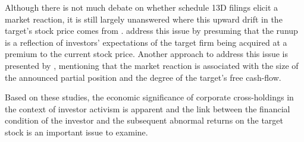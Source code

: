 \documentclass[12pt]{article}
\begin{document}
Although there is not much debate on whether schedule 13D filings elicit a market reaction, it is still largely unanswered where this upward drift in the target's stock price comes from \citep{Greenwood2009}. \citet{Greenwood2009} address this issue by presuming that the runup is a reflection of investors' expectations of the target firm being acquired at a premium to the current stock price. Another approach to address this issue is presented by \citet{Akhigbe2007}, mentioning that the market reaction is associated with the size of the announced partial position and the degree of the target's free cash-flow. 


Based on these studies, the economic significance of corporate cross-holdings in the context of investor activism is apparent and the link between the financial condition of the investor and the subsequent abnormal returns on the target stock is an important issue to examine. 
\end{document}
